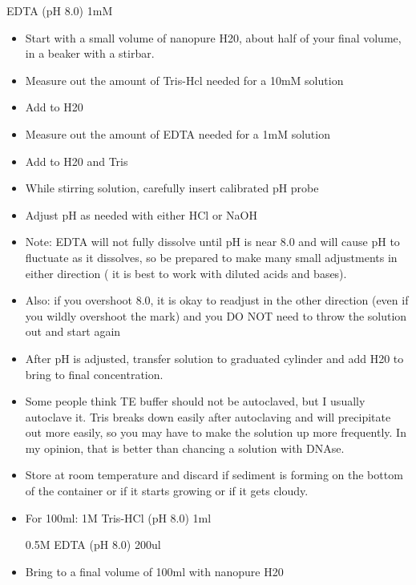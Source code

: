 \documentclass[11pt, oneside]{article}
\begin{document}
			\hspace{5mm}EDTA (pH 8.0)	1mM

		\begin{itemize}

		\itemsep0em

			\item Start with a small volume of nanopure H20, about half of your final volume, in a beaker with a stirbar. 
			\item Measure out the amount of Tris-Hcl needed for a 10mM solution
			\item Add to H20
			\item Measure out the amount of EDTA needed for a 1mM solution
			\item Add to H20 and Tris
			\item While stirring solution, carefully insert calibrated pH probe
			\item Adjust pH as needed with either HCl or NaOH
			\item Note: EDTA will not fully dissolve until pH is near 8.0 and will cause pH to fluctuate as it dissolves, so be prepared to make many 				small adjustments in either direction ( it is best to work with diluted acids and bases). 
			\item Also: if you overshoot 8.0, it is okay to readjust in the other direction (even if you wildly overshoot the mark) and you DO NOT need to 			throw the solution out and start again
			\item After pH is adjusted, transfer solution to graduated cylinder and add H20 to bring to final concentration. 
			\item Some people think TE buffer should not be autoclaved, but I usually autoclave it. Tris breaks down easily after autoclaving and will 				precipitate out more easily, so you may have to make the solution up more frequently. In my opinion, that is better than chancing a solution 			with DNAse. 
			\item Store at room temperature and discard if sediment is forming on the bottom of the container or if it starts growing or if it gets cloudy. 
			\item For 100ml: \hspace{2mm} 1M Tris-HCl (pH 8.0) \hspace{2mm} 	1ml

						  \hspace{23mm} 0.5M EDTA (pH 8.0) \hspace{2mm}	200ul
						  	
			\item Bring to a final volume of 100ml with nanopure H20

		\end{itemize}
\end{document}
